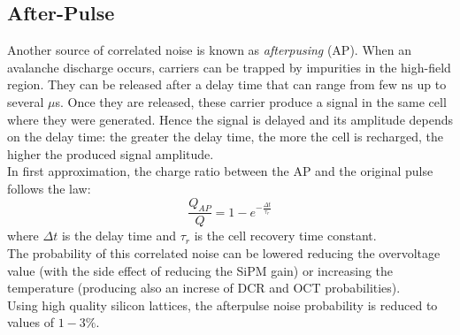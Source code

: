 \subsection{After-Pulse}
Another source of correlated noise is known as \textit{afterpusing} (AP). When an avalanche discharge occurs, carriers can be trapped by impurities in the high-field region. They can be released after a delay time that can range from few ns up to several $\mu$s. Once they are released, these carrier produce a signal in the same cell where they were generated. Hence the signal is delayed and its amplitude depends on the delay time: the greater the delay time, the more the cell is recharged, the higher the produced signal amplitude.\\
In first approximation, the charge ratio between the AP and the original pulse follows the law:
\begin{equation}
    \frac{Q_{AP}}{Q} = 1 - e^{-\frac{\Delta t}{\tau_r}}
\end{equation}
where $\Delta t$ is the delay time and $\tau_r$ is the cell recovery time constant.\\
The probability of this correlated noise can be lowered reducing the overvoltage value (with the side effect of reducing the SiPM gain) or increasing the temperature (producing also an increse of DCR and OCT probabilities).\\
Using high quality silicon lattices, the afterpulse noise probability is reduced to values of $1-3\%$.\\
